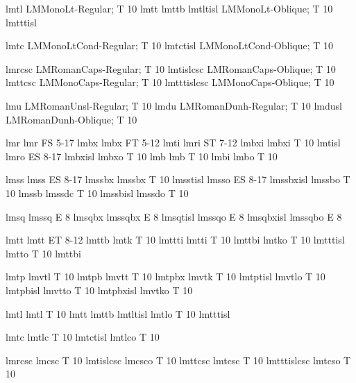    \LMregtfm lmtl      LMMonoLt-Regular;  T  10
       {lmtt}  
      {lmttb}
   \LMregtfm lmtltisl  LMMonoLt-Oblique;  T  10
    {lmtttisl}

   \LMregtfm lmtc      LMMonoLtCond-Regular;  T  10
   \LMregtfm lmtctisl  LMMonoLtCond-Oblique;  T  10

   \LMregtfm lmrcsc      LMRomanCaps-Regular; T  10
   \LMregtfm lmtislcsc   LMRomanCaps-Oblique; T  10
   \LMregtfm lmttcsc     LMMonoCaps-Regular;  T  10
   \LMregtfm lmtttislcsc LMMonoCaps-Oblique;  T  10

   \LMregtfm lmu      LMRomanUnsl-Regular;    T 10
   \LMregtfm lmdu     LMRomanDunh-Regular;    T 10
   \LMregtfm lmdusl   LMRomanDunh-Oblique;    T 10

   \let\ffnameotf=\ffnameotfB
\else
   \LMregtfm lmr       lmr     FS  5-17
   \LMregtfm lmbx      lmbx    FT  5-12
   \LMregtfm lmti      lmri    ST  7-12
   \LMregtfm lmbxi     lmbxi   T   10
   \LMregtfm lmtisl    lmro    ES  8-17
   \LMregtfm lmbxisl   lmbxo   T   10
   \LMregtfm lmb       lmb     T  10
   \LMregtfm lmbi      lmbo    T  10

   \LMregtfm lmss      lmss    ES  8-17
   \LMregtfm lmssbx    lmssbx  T   10
   \LMregtfm lmsstisl  lmsso   ES  8-17
   \LMregtfm lmssbxisl lmssbo  T   10
   \LMregtfm lmssb     lmssdc  T   10
   \LMregtfm lmssbisl  lmssdo  T   10

   \LMregtfm lmsq      lmssq    E  8
   \LMregtfm lmsqbx    lmssqbx  E  8
   \LMregtfm lmsqtisl  lmssqo   E  8
   \LMregtfm lmsqbxisl lmssqbo  E  8

   \LMregtfm lmtt      lmtt    ET  8-12
   \LMregtfm lmttb     lmtk    T   10
   \LMregtfm lmttti    lmtti   T   10
   \LMregtfm lmttbi    lmtko   T   10
   \LMregtfm lmtttisl  lmtto   T   10
    {lmttbi} 

   \LMregtfm lmtp      lmvtl   T  10
   \LMregtfm lmtpb     lmvtt   T  10
   \LMregtfm lmtpbx    lmvtk   T  10
   \LMregtfm lmtptisl  lmvtlo  T  10
   \LMregtfm lmtpbisl  lmvtto  T  10
   \LMregtfm lmtpbxisl lmvtko  T  10

   \LMregtfm lmtl      lmtl   T  10
       {lmtt}  
      {lmttb}
   \LMregtfm lmtltisl  lmtlo  T  10
    {lmtttisl}

   \LMregtfm lmtc      lmtlc   T  10
   \LMregtfm lmtctisl  lmtlco  T  10

   \LMregtfm lmrcsc    lmcsc   T  10
   \LMregtfm lmtislcsc lmcsco  T  10
   \LMregtfm lmttcsc   lmtcsc  T  10
   \LMregtfm lmtttislcsc lmtcso  T  10

